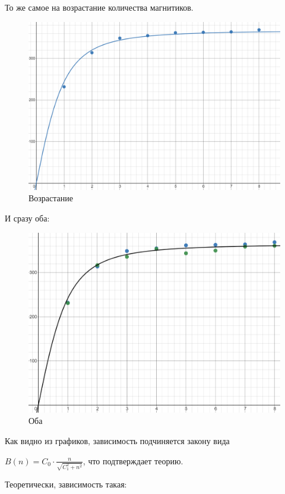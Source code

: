 \documentclass[a4paper,12pt]{article} %
\begin{document}
То же самое на возрастание количества магнитиков.
\begin{figure}[h!]
	\centering
	\includegraphics[scale=0.58]{Pictures/возраст.png}
	\caption*{Возрастание}
\end{figure}
\vspace{35mm}


И сразу оба:
\begin{figure}[h!]
	\centering
	\includegraphics[scale=0.7]{Pictures/оба.png}
	\caption*{Оба}
\end{figure}
\newpage


Как видно из графиков, зависимость подчиняется закону вида 

$B(n) = C_0\cdot \frac{n}{\sqrt{C_1^2 + n^2}}$, что подтверждает теорию.

Теоретически, зависимость такая:
\end{document}
